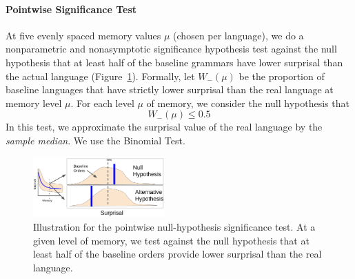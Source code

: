 \paragraph{Pointwise Significance Test}
At five evenly spaced memory values $\mu$ (chosen per language), we do a nonparametric and nonasymptotic significance hypothesis test against the null hypothesis that at least half of the baseline grammars have lower surprisal than the actual language (Figure~\ref{fig:nhst-pointwise}).
Formally, let $W_-(\mu)$ be the proportion of baseline languages that have strictly lower surprisal than the real language at memory level $\mu$.
For each level $\mu$ of memory, we consider the null hypothesis that
\begin{equation}
	W_-(\mu) \leq 0.5
\end{equation}
In this test, we approximate the surprisal value of the real language by the \emph{sample median}.
We use the Binomial Test.




\begin{figure}
	\begin{center}
\includegraphics[width=0.45\textwidth]{figures/nhst.png}
\end{center}
	\caption{Illustration for the pointwise null-hypothesis significance test. At a given level of memory, we test against the null hypothesis that at least half of the baseline orders provide lower surprisal than the real language.}\label{fig:nhst-pointwise}
\end{figure}







